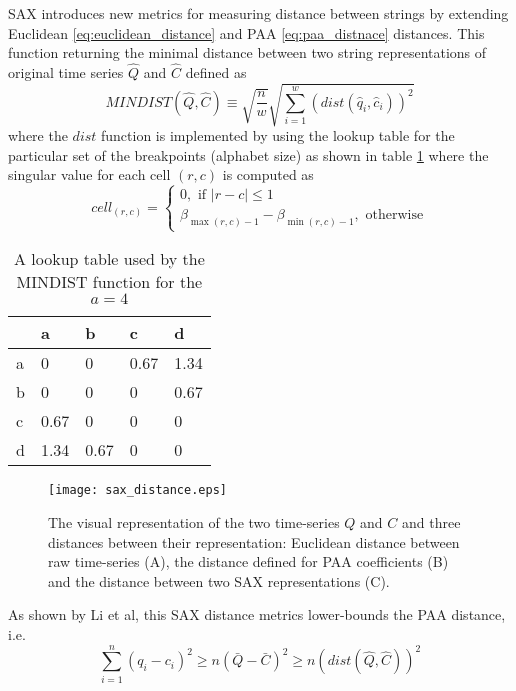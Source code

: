 SAX introduces new metrics for measuring distance between strings by extending Euclidean \ref{eq:euclidean_distance} and PAA \ref{eq:paa_distnace} distances. This function returning the minimal distance between two string representations of original time series $\hat{Q}$ and $\hat{C}$ defined as
\begin{equation}
MINDIST(\hat{Q},\hat{C}) \equiv \sqrt{ \frac{n}{w} } \sqrt{ \sum_{i=1}^{w} ( dist( \hat{q}_{i}, \hat{c}_{i} ) )^{2}}
\label{eq:sax_mindist}
\end{equation} 
where the $dist$ function is implemented by using the lookup table for the particular set of the breakpoints (alphabet size) as shown in table \ref{tbl:sax_lookup} where the singular value for each cell $(r,c)$ is computed as 
\begin{equation}
cell_{(r,c)} = 
\begin{cases} 
0, \text{ if }\left| r-c \right| \leq 1 \\
\beta_{\max(r,c) - 1} - \beta_{\min(r,c) - 1}, \text{ otherwise}
\end{cases}
\label{eq:cell}
\end{equation}
\begin{table}
\begin{tabularx}{400pt}{X X X X X}
\hline
   & a   & b    & c    & d    \\
\hline
a & 0    & 0    & 0.67 & 1.34 \\
b & 0    & 0    & 0    & 0.67 \\
c & 0.67 & 0    & 0    & 0    \\
d & 1.34 & 0.67 & 0    & 0    \\
\hline
\end{tabularx}
\caption{A lookup table used by the MINDIST function for the $a=4$}
\label{tbl:sax_lookup}
\end{table}
\begin{figure}[tbp]
   \centering
   \texttt{[image: sax\_distance.eps]}
   \caption{The visual representation of the two time-series $Q$ and $C$ and three distances between their representation: Euclidean distance between raw time-series (A), the distance defined for PAA coefficients (B) and the distance between two SAX representations (C).}
   \label{fig:sax_distance}
\end{figure}

As shown by Li et al, this SAX distance metrics lower-bounds the PAA distance, i.e.
\begin{equation}
\sum_{i=1}^{n} (q_{i} - c_{i})^{2} \geq n(\bar{Q} - \bar{C})^{2} \geq n(dist(\hat{Q},\hat{C}))^2
\label{eq:sax_bounding}
\end{equation}
